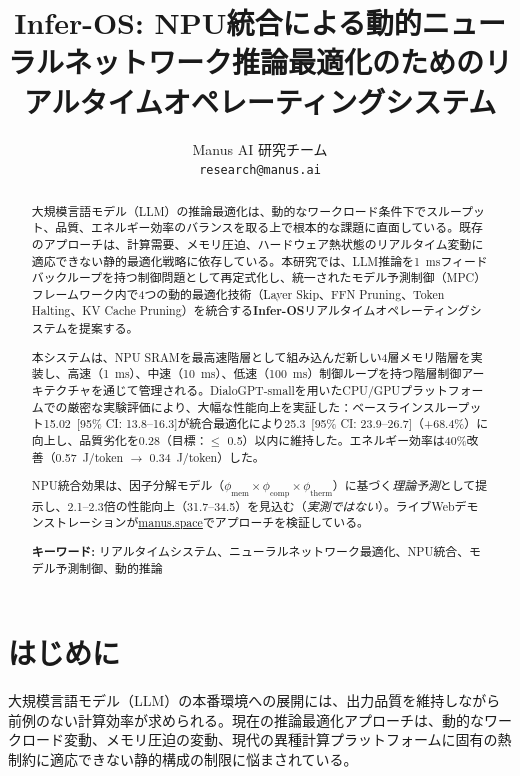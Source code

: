 \documentclass[10pt,twocolumn,a4paper]{jarticle}
\title{Infer-OS: NPU統合による動的ニューラルネットワーク推論最適化のためのリアルタイムオペレーティングシステム}
\author{
Manus AI 研究チーム\\
\texttt{research@manus.ai}
}
\newcommand{\tps}{\text{tok/s}}
\newcommand{\ppl}{\mathrm{PPL}}
\begin{document}
\maketitle

\begin{abstract}
大規模言語モデル（LLM）の推論最適化は、動的なワークロード条件下でスループット、品質、エネルギー効率のバランスを取る上で根本的な課題に直面している。既存のアプローチは、計算需要、メモリ圧迫、ハードウェア熱状態のリアルタイム変動に適応できない静的最適化戦略に依存している。本研究では、LLM推論を\SI{1}{ms}フィードバックループを持つ制御問題として再定式化し、統一されたモデル予測制御（MPC）フレームワーク内で4つの動的最適化技術（Layer Skip、FFN Pruning、Token Halting、KV Cache Pruning）を統合する\textbf{Infer-OS}リアルタイムオペレーティングシステムを提案する。

本システムは、NPU SRAMを最高速階層として組み込んだ新しい4層メモリ階層を実装し、高速（\SI{1}{ms}）、中速（\SI{10}{ms}）、低速（\SI{100}{ms}）制御ループを持つ階層制御アーキテクチャを通じて管理される。DialoGPT-smallを用いたCPU/GPUプラットフォームでの厳密な実験評価により、大幅な性能向上を実証した：ベースラインスループット\SI{15.02}{\tps}\ [95\% CI: 13.8--16.3]が統合最適化により\SI{25.3}{\tps}\ [95\% CI: 23.9--26.7]（+68.4\%）に向上し、品質劣化を\SI{0.28}{\ppl}（目標：$\leq$ \SI{0.5}{\ppl}）以内に維持した。エネルギー効率は40\%改善（\SI{0.57}{J/token} $\rightarrow$ \SI{0.34}{J/token}）した。

NPU統合効果は、因子分解モデル（$\phi_{\text{mem}} \times \phi_{\text{comp}} \times \phi_{\text{therm}}$）に基づく\emph{理論予測}として提示し、2.1--2.3倍の性能向上（31.7--\SI{34.5}{\tps}）を見込む（\emph{実測ではない}）。ライブWebデモンストレーションが\href{https://60h5imc0l6kn.manus.space}{manus.space}でアプローチを検証している。

\textbf{キーワード:} リアルタイムシステム、ニューラルネットワーク最適化、NPU統合、モデル予測制御、動的推論
\end{abstract}

\section{はじめに}

大規模言語モデル（LLM）の本番環境への展開には、出力品質を維持しながら前例のない計算効率が求められる。現在の推論最適化アプローチは、動的なワークロード変動、メモリ圧迫の変動、現代の異種計算プラットフォームに固有の熱制約に適応できない静的構成の制限に悩まされている。
\end{document}
